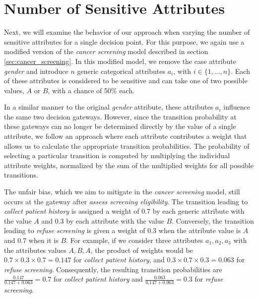 \section{Number of Sensitive Attributes}  
Next, we will examine the behavior of our approach when varying the number of sensitive attributes for a single decision point.
For this purpose, we again use a modified version of the \textit{cancer screening} model described in section \ref{sec:cancer_screening}.
In this modified model, we remove the case attribute \textit{gender} and introduce $n$ generic categorical attributes $a_i$, with $i \in \{1, ..., n\}$.
Each of these attributes is considered to be sensitive and can take one of two possible values, $A$ or $B$, with a chance of 50\% each.

In a similar manner to the original \textit{gender} attribute, these attributes $a_i$ influence the same two decision gateways.  
However, since the transition probability at these gateways can no longer be determined directly by the value of a single attribute,
we follow an approach where each attribute contributes a weight that allows us to calculate the appropriate transition probabilities.
The probability of selecting a particular transition is computed by multiplying the individual attribute weights,
normalized by the sum of the multiplied weights for all possible transitions.

The unfair bias, which we aim to mitigate in the \textit{cancer screening} model, still occurs at the gateway after \textit{assess screening eligibility}.
The transition leading to \textit{collect patient history} is assigned a weight of $0.7$ by each generic attribute with the value $A$ and $0.3$ by each attribute with the value $B$.
Conversely, the transition leading to \textit{refuse screening} is given a weight of $0.3$ when the attribute value is $A$ and $0.7$ when it is $B$.
For example, if we consider three attributes $a_1, a_2, a_3$ with the attributes values $A, B, A$,
the product of weights would be $0.7 \times 0.3 \times 0.7 = 0.147$ for \textit{collect patient history},
and $0.3 \times 0.7 \times 0.3 = 0.063$ for \textit{refuse screening}.
Consequently, the resulting transition probabilities are $\frac{0.147}{0.147+0.063} = 0.7$ for \textit{collect patient history}
and $\frac{0.063}{0.147+0.063} = 0.3$ for \textit{refuse screening}.

